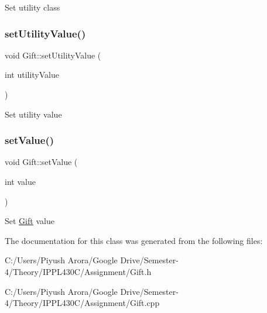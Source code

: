 Set utility class \mbox{\label{class_gift_a3d29773a61661250ca59b63f28351d23}} 
\subsubsection{\texorpdfstring{set\+Utility\+Value()}{setUtilityValue()}}
{\footnotesize\ttfamily void Gift\+::set\+Utility\+Value (\begin{DoxyParamCaption}\item[{int}]{utility\+Value }\end{DoxyParamCaption})}

Set utility value \mbox{\label{class_gift_a40368c3ac78745ce67d3a2496ba3e9ce}} 
\subsubsection{\texorpdfstring{set\+Value()}{setValue()}}
{\footnotesize\ttfamily void Gift\+::set\+Value (\begin{DoxyParamCaption}\item[{int}]{value }\end{DoxyParamCaption})}

Set \hyperlink{class_gift}{Gift} value 

The documentation for this class was generated from the following files\+:\begin{DoxyCompactItemize}
\item 
C\+:/\+Users/\+Piyush Arora/\+Google Drive/\+Semester-\/4/\+Theory/\+I\+P\+P\+L430\+C/\+Assignment/Gift.\+h\item 
C\+:/\+Users/\+Piyush Arora/\+Google Drive/\+Semester-\/4/\+Theory/\+I\+P\+P\+L430\+C/\+Assignment/Gift.\+cpp\end{DoxyCompactItemize}

